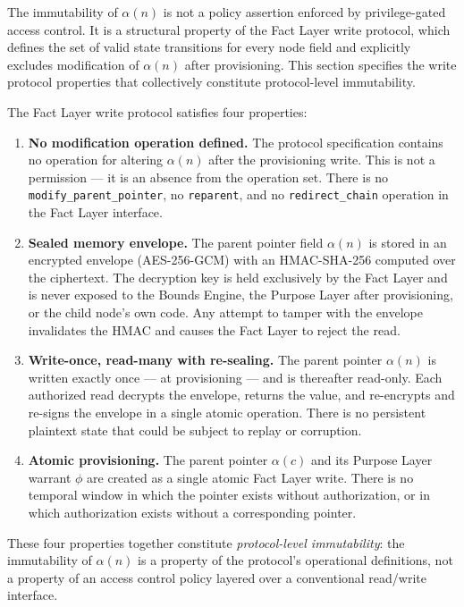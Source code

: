 The immutability of $\alpha(n)$ is not a policy assertion enforced by privilege-gated access control. It is a structural property of the Fact Layer write protocol, which defines the set of valid state transitions for every node field and explicitly excludes modification of $\alpha(n)$ after provisioning. This section specifies the write protocol properties that collectively constitute protocol-level immutability.

The Fact Layer write protocol satisfies four properties:

\begin{enumerate}
\item[(W1)] \textbf{No modification operation defined.} The protocol specification contains no operation for altering $\alpha(n)$ after the provisioning write. This is not a permission --- it is an absence from the operation set. There is no \texttt{modify\_parent\_pointer}, no \texttt{reparent}, and no \texttt{redirect\_chain} operation in the Fact Layer interface.

\item[(W2)] \textbf{Sealed memory envelope.} The parent pointer field $\alpha(n)$ is stored in an encrypted envelope (AES-256-GCM) with an HMAC-SHA-256 computed over the ciphertext. The decryption key is held exclusively by the Fact Layer and is never exposed to the Bounds Engine, the Purpose Layer after provisioning, or the child node's own code. Any attempt to tamper with the envelope invalidates the HMAC and causes the Fact Layer to reject the read.

\item[(W3)] \textbf{Write-once, read-many with re-sealing.} The parent pointer $\alpha(n)$ is written exactly once --- at provisioning --- and is thereafter read-only. Each authorized read decrypts the envelope, returns the value, and re-encrypts and re-signs the envelope in a single atomic operation. There is no persistent plaintext state that could be subject to replay or corruption.

\item[(W4)] \textbf{Atomic provisioning.} The parent pointer $\alpha(c)$ and its Purpose Layer warrant $\phi$ are created as a single atomic Fact Layer write. There is no temporal window in which the pointer exists without authorization, or in which authorization exists without a corresponding pointer.
\end{enumerate}

These four properties together constitute \emph{protocol-level immutability}: the immutability of $\alpha(n)$ is a property of the protocol's operational definitions, not a property of an access control policy layered over a conventional read/write interface.

